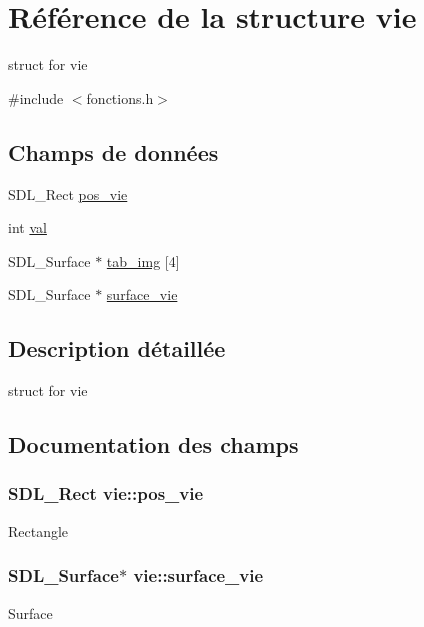 \hypertarget{structvie}{}\section{Référence de la structure vie}
\label{structvie}


struct for vie  




{\ttfamily \#include $<$fonctions.\+h$>$}

\subsection*{Champs de données}
\begin{DoxyCompactItemize}
\item 
S\+D\+L\+\_\+\+Rect \hyperlink{structvie_a2c449c68f658579371dd947f2c801e3d}{pos\+\_\+vie}
\item 
int \hyperlink{structvie_a869d0f8aa7f186ea5117f7e8df5c3be6}{val}
\item 
S\+D\+L\+\_\+\+Surface $\ast$ \hyperlink{structvie_a979731322bbb07c11075b549718f6416}{tab\+\_\+img} \mbox{[}4\mbox{]}
\item 
S\+D\+L\+\_\+\+Surface $\ast$ \hyperlink{structvie_ab10f55c6b06a5ea9d29c38eb44633e37}{surface\+\_\+vie}
\end{DoxyCompactItemize}


\subsection{Description détaillée}
struct for vie 

\subsection{Documentation des champs}
\subsubsection[{\texorpdfstring{pos\+\_\+vie}{pos_vie}}]{\setlength{\rightskip}{0pt plus 5cm}S\+D\+L\+\_\+\+Rect vie\+::pos\+\_\+vie}\hypertarget{structvie_a2c449c68f658579371dd947f2c801e3d}{}\label{structvie_a2c449c68f658579371dd947f2c801e3d}
Rectangle 
\subsubsection[{\texorpdfstring{surface\+\_\+vie}{surface_vie}}]{\setlength{\rightskip}{0pt plus 5cm}S\+D\+L\+\_\+\+Surface$\ast$ vie\+::surface\+\_\+vie}\hypertarget{structvie_ab10f55c6b06a5ea9d29c38eb44633e37}{}\label{structvie_ab10f55c6b06a5ea9d29c38eb44633e37}
Surface 
